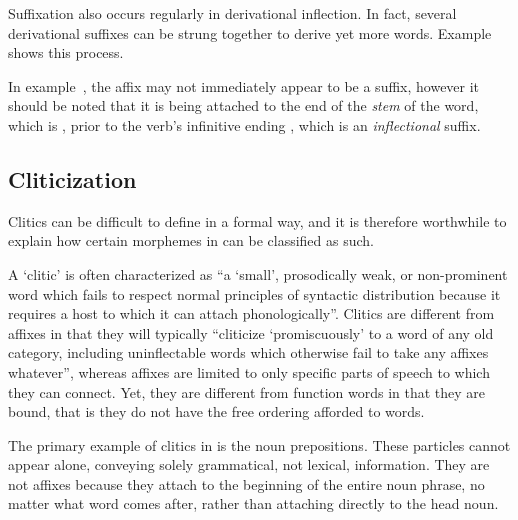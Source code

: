 Suffixation also occurs regularly in derivational inflection. In fact, several derivational suffixes can be strung together to derive yet more words. Example~ shows this process.

	  
	\a<der11>  
	\a<der12>   
	\a<root2>  
	\a<der21>  
	\a<der22>  
\xe

In example~, the  affix may not immediately appear to be a suffix, however it should be noted that it is being attached to the end of the \emph{stem} of the word, which is , prior to the verb's infinitive ending , which is an \emph{inflectional} suffix.


\subsection{Cliticization}
\label{subsec:tvk-cliticization}

Clitics can be difficult to define in a formal way, and it is therefore worthwhile to explain how certain morphemes in \langtvk{} can be classified as such.

A \enquote*{clitic} is often characterized as \enquote{a \enquote{small}, prosodically weak, or non-prominent word which fails to respect normal principles of syntactic distribution because it requires a host to which it can attach phonologically}\autocite{spencer-luis-2012}. Clitics are different from affixes in that they will typically \enquote{cliticize \enquote{promiscuously} to a word of any old category, including uninflectable words which otherwise fail to take any affixes whatever}\autocite{spencer-luis-2012}, whereas affixes are limited to only specific parts of speech to which they can connect\autocite{Zwicky-and-pullum-1983}. Yet, they are different from function words in that they are bound, that is they do not have the free ordering afforded to words\autocite{Zwicky-1985}.

The primary example of clitics in \langtvk{} is the noun prepositions. These particles cannot appear alone, conveying solely grammatical, not lexical, information. They are not affixes because they attach to the beginning of the entire noun phrase, no matter what word comes after, rather than attaching directly to the head noun.

